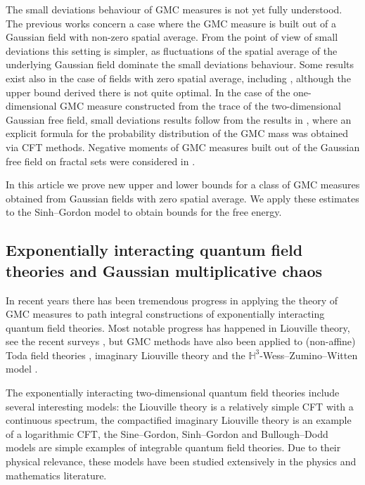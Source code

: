 \documentclass[11pt]{article}
\numberwithin{equation}{section}
\newcounter{exa}
\theoremstyle{definition}
\begin{document}
The small deviations behaviour of GMC measures is not yet fully understood. The previous works \cite{Nik, TaWi} concern a case where the GMC measure is built out of a Gaussian field with non-zero spatial average. From the point of view of small deviations this setting is simpler, as fluctuations of the spatial average of the underlying Gaussian field dominate the small deviations behaviour. Some results exist also in the case of fields with zero spatial average, including \cite{LRV}, although the upper bound derived there is not quite optimal. In the case of the one-dimensional GMC measure constructed from the trace of the two-dimensional Gaussian free field, small deviations results follow from the results in \cite{remy1, remy2}, where an explicit formula for the probability distribution of the GMC mass was obtained via CFT methods. Negative moments of GMC measures built out of the Gaussian free field on fractal sets were considered in \cite{GHSS}.

In this article we prove new upper and lower bounds for a class of GMC measures obtained from Gaussian fields with zero spatial average. We apply these estimates to the Sinh--Gordon model to obtain bounds for the free energy.


\subsection{Exponentially interacting quantum field theories and Gaussian multiplicative chaos}

In recent years there has been tremendous progress in applying the theory of GMC measures to path integral constructions of exponentially interacting quantum field theories. Most notable progress has happened in Liouville theory, see the recent surveys \cite{GKR, witten}, but GMC methods have also been applied to (non-affine) Toda field theories \cite{toda}, imaginary Liouville theory \cite{imaginary, chatterjee, imaginary2} and the $\mathbb{H}^3$-Wess--Zumino--Witten model \cite{wzw}.

The exponentially interacting two-dimensional quantum field theories include several interesting models: the Liouville theory is a relatively simple CFT with a continuous spectrum, the compactified imaginary Liouville theory is an example of a logarithmic CFT, the Sine--Gordon, Sinh--Gordon and Bullough--Dodd models are simple examples of integrable quantum field theories. Due to their physical relevance, these models have been studied extensively in the physics and mathematics literature.
\end{document}
